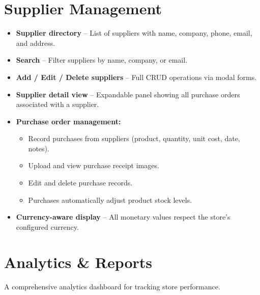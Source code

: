 \documentclass[12pt,a4paper]{article}
\begin{document}
\section{Supplier Management}

\begin{itemize}[leftmargin=1.5em]
  \item \textbf{Supplier directory} -- List of suppliers with name, company,
        phone, email, and address.
  \item \textbf{Search} -- Filter suppliers by name, company, or email.
  \item \textbf{Add / Edit / Delete suppliers} -- Full CRUD operations via
        modal forms.
  \item \textbf{Supplier detail view} -- Expandable panel showing all purchase
        orders associated with a supplier.
  \item \textbf{Purchase order management:}
    \begin{itemize}
      \item Record purchases from suppliers (product, quantity, unit cost,
            date, notes).
      \item Upload and view purchase receipt images.
      \item Edit and delete purchase records.
      \item Purchases automatically adjust product stock levels.
    \end{itemize}
  \item \textbf{Currency-aware display} -- All monetary values respect the
        store's configured currency.
\end{itemize}

\section{Analytics \& Reports}

A comprehensive analytics dashboard for tracking store performance.
\end{document}
